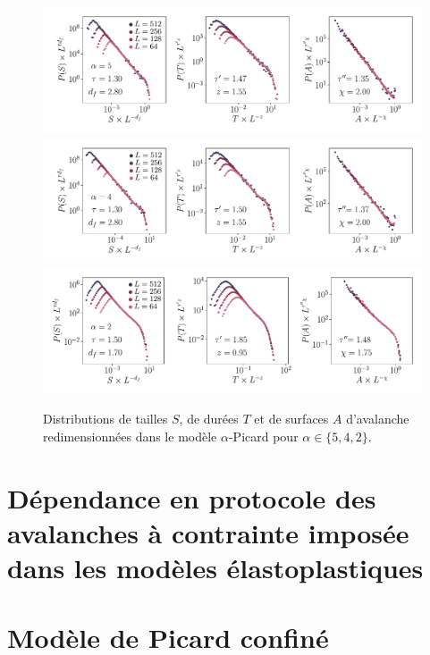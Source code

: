\begin{figure}[H]
	\centering
	\includegraphics[width=\textwidth]{Chapitre4/Figures/Avalanches/Rescale_Av_alpha5.pdf}
	\includegraphics[width=\textwidth]{Chapitre4/Figures/Avalanches/Rescale_Av_alpha4.pdf}
	\includegraphics[width=\textwidth]{Chapitre4/Figures/Avalanches/Rescale_Av_alpha2.pdf}
	\caption{Distributions de tailles $S$, de durées $T$ et de surfaces $A$ d'avalanche redimensionnées dans le modèle $\alpha$-Picard pour $\alpha \in \{5, 4, 2 \}$.}
	\label{fig:Av_rescale_alpha_annexe}
\end{figure}

\resumetocwriting

\section{Dépendance en protocole des avalanches à contrainte imposée dans les modèles élastoplastiques}

\label{sec:article2}



\section{Modèle de Picard confiné}


